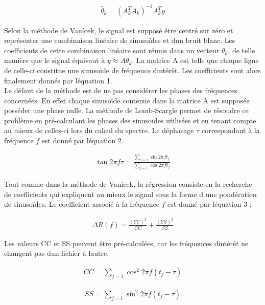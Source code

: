 \documentclass[letterpaper]{article}
\begin{document}
\begin{align}
\hat{\theta}_{k} = (A_{k}^{T} A_{k})^{-1} A_{k}^{T} y
\end{align}

Selon la méthode de Vanícek, le signal est supposé être centré sur zéro et représenter une combinaison linéaire de sinusoïdes et d\textquotesingle un bruit blanc.
Les coefficients de cette combinaison linéaire sont réunis dans un vecteur $\theta_{k}$, de telle manière que le signal équivaut à $y \approx A\theta_{k}$.
La matrice A est telle que chaque ligne de celle-ci constitue une sinusoïde de fréquence d\textquotesingle intérêt. Les coefficients sont alors finalement
donnés par l\textquotesingle équation 1. \citep{PS}\\

Le défaut de la méthode est de ne pas considérer les phases des fréquences concernées. En effet chaque sinusoïde contenue dans la matrice A
est supposée posséder une phase nulle. La méthode de Lomb-Scargle permet de résoudre ce problème en pré-calculant les phases des sinusoïdes
utilisées et en tenant compte au mieux de celles-ci lors du calcul du spectre. Le déphasage $\tau$ correspondant à la fréquence $f$ est donné par
l\textquotesingle équation 2. \citep{LS}

\begin{align}
\tan 2\pi f \tau = \frac{\sum\limits_{j=1} \sin 2\pi f t_{j}}{\sum\limits_{j=1} \cos 2\pi f t_{j}}
\end{align}

Tout comme dans la méthode de Vanícek, la régression consiste en la recherche de coefficients qui expliquent au mieux le signal sous la forme d\textquotesingle
une pondération de sinusoïdes. Le coefficient associé à la fréquence $f$ est donné par l\textquotesingle équation 3 :

\begin{align}
\Delta R(f) = \frac{(YC)^{2}}{CC} 
+ \frac{(YS)^{2}}{SS}
\end{align}

Les valeurs CC et SS peuvent être pré-calculées, car les fréquences d\textquotesingle intérêt ne changent pas d\textquotesingle un fichier
à l\textquotesingle autre.

\begin{align}
CC = \sum\limits_{j=1} \cos^{2} 2\pi f (t_{j} - \tau)
\end{align}

\begin{align}
SS = \sum\limits_{j=1} \sin^{2} 2\pi f (t_{j} - \tau)
\end{align}
\end{document}
